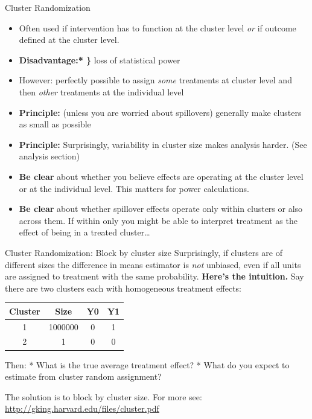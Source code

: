 \documentclass[
  11pt,
  ignorenonframetext,
]{beamer}
\begin{document}
\begin{frame}{Cluster Randomization}
\protect\hypertarget{cluster-randomization-2}{}
\begin{itemize}
\item
  Often used if intervention has to function at the cluster level
  \textit{or} if outcome defined at the cluster level.
\item
  \textbf{Disadvantage:* \}} loss of statistical power
\item
  However: perfectly possible to assign \emph{some} treatments at
  cluster level and then \emph{other} treatments at the individual level

  \footnotesize
\item
  \textbf{Principle:} (unless you are worried about spillovers)
  generally make clusters as small as possible
\item
  \textbf{Principle:} Surprisingly, variability in cluster size makes
  analysis harder. (See analysis section)\\
\item
  \textbf{Be clear} about whether you believe effects are operating at
  the cluster level or at the individual level. This matters for power
  calculations.
\item
  \textbf{Be clear} about whether spillover effects operate only within
  clusters or also across them. If within only you might be able to
  interpret treatment as the effect of being in a treated cluster\dots 
\end{itemize}
\end{frame}

\begin{frame}{Cluster Randomization: Block by cluster size}
\protect\hypertarget{cluster-randomization-block-by-cluster-size}{}
\small Surprisingly, if clusters are of different sizes the difference
in means estimator is \textit{not} unbiased, even if all units are
assigned to treatment with the same probability. \bigskip
\textbf{Here's the intuition.} Say there are two clusters each with
homogeneous treatment effects:

\begin{table}
\begin{tabular}{cccc}
Cluster & Size  & Y0 &  Y1 \\ \hline
1   &  1000000  &  0    &  1 \\
2   &  1    &  0    &  0
\end{tabular} 
\end{table}

Then: * What is the true average treatment effect? * What do you expect
to estimate from cluster random assignment?

The solution is to block by cluster size. For more see:
\url{http://gking.harvard.edu/files/cluster.pdf}
\end{frame}
\end{document}
